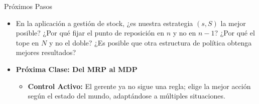 \documentclass[xcolor=dvipsnames]{beamer}
\begin{document}
\begin{frame}{Pr\'oximos Pasos}

\begin{itemize}
\item En la aplicaci\'on a gesti\'on de stock, ¿es nuestra estrategia $(s, S)$ la mejor posible? ¿Por qu\'e fijar el punto de reposici\'on en $n$ y no en $n-1$? ¿Por qu\'e el tope en $N$ y no el doble? ¿Es posible que otra estructura de pol\'itica obtenga mejores resultados?

\item<2->\textbf{Próxima Clase: Del MRP al MDP}
\begin{itemize}
    \item<3-> \textbf{Control Activo:} El gerente ya no sigue una regla; elige la mejor acción seg\'un el estado del mundo, adapt\'andose a m\'ultiples situaciones.
\end{itemize}
\end{itemize}
\end{frame}
\end{document}
